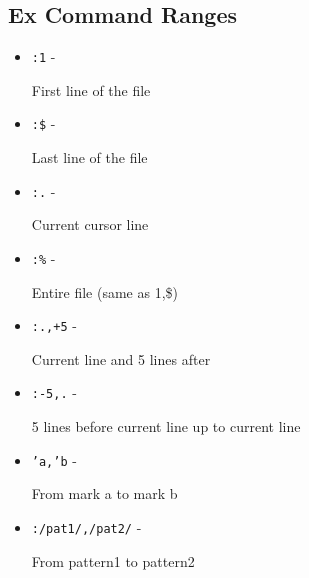 \documentclass[6pt,landscape]{article}
\newcommand{\key}[1]{\texttt{#1}}
\begin{document}
\begin{multicols*}{5}
\section*{Ex Command Ranges}
\begin{itemize}[leftmargin=*,itemsep=0.1em,parsep=0pt,topsep=0pt]
\item \key{:1} - \parbox[t]{\linewidth-3em}{First line of the file}
\item \key{:\$} - \parbox[t]{\linewidth-3em}{Last line of the file}
\item \key{:.} - \parbox[t]{\linewidth-3em}{Current cursor line}
\item \key{:\%} - \parbox[t]{\linewidth-3em}{Entire file (same as 1,\$)}
\item \key{:.,+5} - \parbox[t]{\linewidth-3em}{Current line and 5 lines after}
\item \key{:-5,.} - \parbox[t]{\linewidth-3em}{5 lines before current line up to current line}
\item \key{'a,'b} - \parbox[t]{\linewidth-3em}{From mark a to mark b}
\item \key{:/pat1/,/pat2/} - \parbox[t]{\linewidth-3em}{From pattern1 to pattern2}
\end{itemize}

\end{multicols*}
\end{document}
